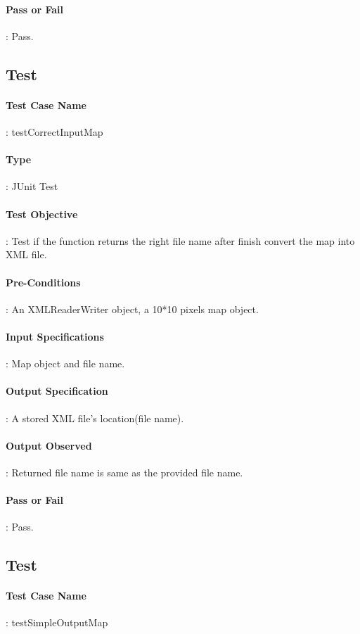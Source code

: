 \documentclass[12pt, a4paper]{report}
\begin{document}
\paragraph{Pass or Fail}: Pass.

\pagebreak
\addtocounter{casecounter}{1}
\subsection{Test }
\paragraph{Test Case Name}: testCorrectInputMap
\paragraph{Type}: JUnit Test
\paragraph{Test Objective}: Test if the function returns the right file name after finish convert the map into XML file.
\paragraph{Pre-Conditions}: An XMLReaderWriter object, a 10*10 pixels map object. 
\paragraph{Input Specifications}: Map object and file name.
\paragraph{Output Specification}: A stored XML file's location(file name). 
\paragraph{Output Observed}: Returned file name is same as the provided file name.
\paragraph{Pass or Fail}: Pass.

\addtocounter{casecounter}{1}
\subsection{Test }
\paragraph{Test Case Name}: testSimpleOutputMap
\end{document}
